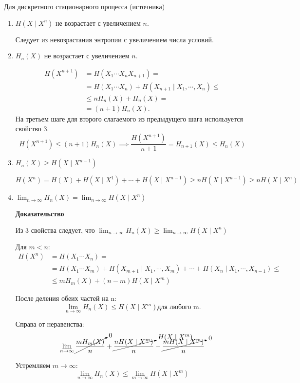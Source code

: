 Для дискретного стационарного процесса (источника)
\begin{enumerate}
    \item $H(X \mid X^n)$ не возрастает с увеличением $n$.

        Следует из невозрастания энтропии с увеличением числа условий.

    \item $H_n(X)$ не возрастает с увеличением $n$. 
         
        \begin{align*}
            H(X^{n+1}) &= H(X_1 \cdots X_n X_{n+1}) =
                       \\
                       &= H(X_1 \cdots X_n) + H(X_{n+1} \mid X_1, \cdots, X_n)
                       \leq
                       \\
                       &\leq nH_n(X) + H_n(X) =
                       \\
                       &= (n + 1) H_n(X).
        \end{align*}
        На третьем шаге для второго слагаемого из предыдущего шага используется
        свойство 3.
        \[
            H(X^{n+1}) \leq (n + 1) H_n(X) \implies \frac{H(X^{n+1})}{n + 1} =
            H_{n+1}(X) \leq H_n(X)
        \]
            

    \item $H_n(X) \geq H(X \mid X^{n-1})$

        \[
            H(X^n) = H(X) + H(X \mid X^1) + \cdots + H(X \mid X^{n-1}) \geq
            nH(X \mid X^{n-1}) \geq nH(X \mid X^n)
        \]

    \item $\lim_{n \to \infty} H_n(X) = \lim_{n \to \infty} H(X \mid X^n)$

        \textbf{Доказательство}

        Из 3 свойства следует, что $\lim_{n \to \infty} H_n(X) \geq \lim_{n \to
        \infty} H(X \mid X^n)$

        Для $m < n$:
        \begin{align*}
            H(X^n) &= H(X_1 \cdots X_n) =
                    \\
                   &= H(X_1 \cdots X_m) + H(X_{m+1} \mid X_1, \cdots, X_m) +
                   \cdots + H(X_n \mid X_1, \cdots, X_{n-1}) \leq
                   \\
                   &\leq mH_m(X) + (n - m) H(X \mid X^m)
        \end{align*}

        После деления обеих частей на n:
        \[
            \lim_{n \to \infty} H_n(X) \leq H(X \mid X^m) \text{для любого m.}
        \]

        Справа от неравенства: 
        \[
            \lim_{n \to \infty} \cancelto{0}{\frac{mH_m(X)}{n}} +
            \cancelto{H(X \mid X^m)}{\frac{nH(X \mid X^m)}{n}} - \cancelto{0}{\frac{mH(X \mid
            X^m)}{n}}
        \]

        Устремляем $m \to \infty$:
        \[
            \lim_{n \to \infty} H_n(X) \leq \lim_{m \to \infty} H(X \mid X^m)
        \]
\end{enumerate}

